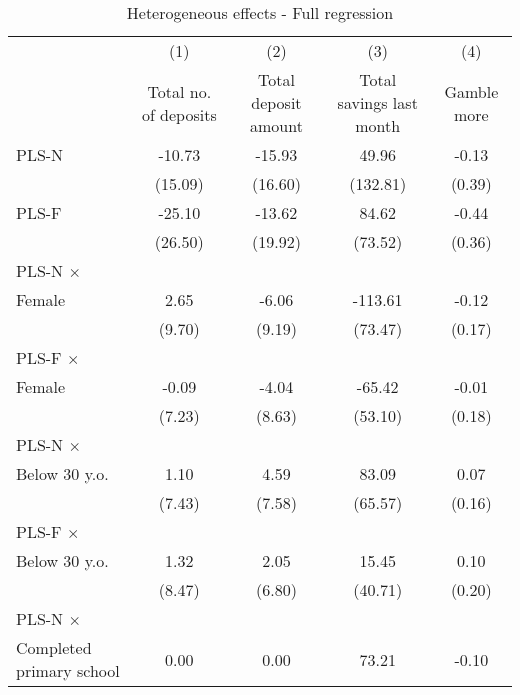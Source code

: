 \begin{table}[htbp]\centering
\def\sym#1{\ifmmode^{#1}\else\(^{#1}\)\fi}
\caption{Heterogeneous effects - Full regression}
\begin{tabular}{l*{4}{c}}
\toprule
                &\multicolumn{1}{c}{(1)}&\multicolumn{1}{c}{(2)}&\multicolumn{1}{c}{(3)}&\multicolumn{1}{c}{(4)}\\
                &\multicolumn{1}{c}{Total no. of deposits}&\multicolumn{1}{c}{Total deposit amount}&\multicolumn{1}{c}{Total savings last month}&\multicolumn{1}{c}{Gamble more}\\
\midrule
PLS-N           &   -10.73         &   -15.93         &    49.96         &    -0.13         \\
                &  (15.09)         &  (16.60)         & (132.81)         &   (0.39)         \\
\addlinespace
PLS-F           &   -25.10         &   -13.62         &    84.62         &    -0.44         \\
                &  (26.50)         &  (19.92)         &  (73.52)         &   (0.36)         \\
\addlinespace
PLS-N $\times$ \\ Female&     2.65         &    -6.06         &  -113.61         &    -0.12         \\
                &   (9.70)         &   (9.19)         &  (73.47)         &   (0.17)         \\
\addlinespace
PLS-F $\times$ \\ Female&    -0.09         &    -4.04         &   -65.42         &    -0.01         \\
                &   (7.23)         &   (8.63)         &  (53.10)         &   (0.18)         \\
\addlinespace
PLS-N $\times$ \\ Below 30 y.o.&     1.10         &     4.59         &    83.09         &     0.07         \\
                &   (7.43)         &   (7.58)         &  (65.57)         &   (0.16)         \\
\addlinespace
PLS-F $\times$ \\ Below 30 y.o.&     1.32         &     2.05         &    15.45         &     0.10         \\
                &   (8.47)         &   (6.80)         &  (40.71)         &   (0.20)         \\
\addlinespace
PLS-N $\times$ \\ Completed primary school&     0.00         &     0.00         &    73.21         &    -0.10         \\

\end{tabular}
\end{table}
